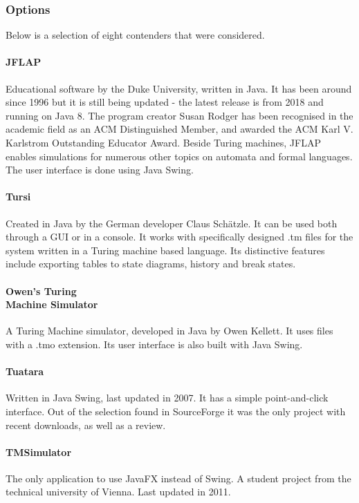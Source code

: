 \documentclass[12pt,a4,xcolor=table]{article}
\begin{document}
\subsubsection{Options}
Below is a selection of eight contenders that were considered.

\begin{multicols}{4}
	\paragraph{JFLAP} 
	Educational software by the Duke University, written in Java. It has been around since 1996 but it is still being updated - the latest release is from 2018 and running on Java 8. The program creator Susan Rodger has been recognised in the academic field as an ACM Distinguished Member, and awarded the ACM Karl V. Karlstrom Outstanding Educator Award. Beside Turing machines, JFLAP enables simulations for numerous other topics on automata and formal languages. The user interface is done using Java Swing.
	\paragraph{Tursi}
	Created in Java by the German developer Claus Schätzle. It can be used both through a GUI or in a console. It works with specifically designed .tm files for the system written in a Turing machine based language. Its distinctive features include exporting tables to state diagrams, history and break states.
	\paragraph{Owen's Turing \\Machine Simulator}
	A Turing Machine simulator, developed  in Java by Owen Kellett. It uses files with a .tmo extension. Its user interface is also built with Java Swing.
	\paragraph{Tuatara} 
	Written in Java Swing, last updated in 2007. It has a simple point-and-click interface. Out of the selection found in SourceForge it was the only project with recent downloads, as well as a review. 	
	\paragraph{TMSimulator}
	The only application to use JavaFX instead of Swing. A student project from the technical university of Vienna. Last updated in 2011.

\end{multicols}
\end{document}

